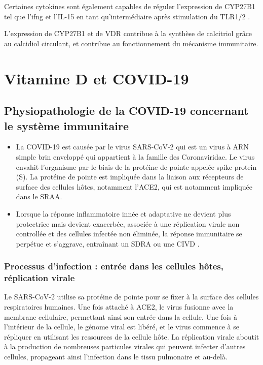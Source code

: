 \documentclass[
  a4paper,
  DIV=11,
  numbers=noendperiod,
  listof=totoc]{scrreprt}
\begin{document}
Certaines cytokines sont également capables de réguler l'expression de
\ac{CYP27B1} tel que l'\ac{ifng} \autocite{Stoffels.2009} et l'IL-15 en
tant qu'intermédiaire après stimulation du TLR1/2
\autocite{Krutzik.2008}.

L'expression de \ac{CYP27B1} et de \ac{VDR} contribue à la synthèse de
calcitriol grâce au calcidiol circulant, et contribue au fonctionnement
du mécanisme immunitaire.

\newpage{}

\chapter{Vitamine D et COVID-19}\label{vitamine-d-et-covid-19}

\section{Physiopathologie de la COVID-19 concernant le système
immunitaire}\label{physiopathologie-de-la-covid-19-concernant-le-systuxe8me-immunitaire}

\begin{itemize}
\item
  La \ac{COVID-19} est causée par le virus \ac{SARS-CoV-2} qui est un
  virus à ARN simple brin enveloppé qui appartient à la famille des
  Coronaviridae. Le virus envahit l'organisme par le biais de la
  protéine de pointe appelée spike protein (S). La protéine de pointe
  est impliquée dans la liaison aux récepteurs de surface des cellules
  hôtes, notamment l'\ac{ACE2}, qui est notamment impliquée dans le
  \ac{SRAA}.
\item
  Lorsque la réponse inflammatoire innée et adaptative ne devient plus
  protectrice mais devient exacerbée, associée à une réplication virale
  non controllée et des cellules infectée non éliminée, la réponse
  immunitaire se perpétue et s'aggrave, entraînant un \ac{SDRA} ou une
  \ac{CIVD} \autocite{Contreras-Bolívar.2023}.
\end{itemize}

\subsection{Processus d'infection : entrée dans les cellules hôtes,
réplication
virale}\label{processus-dinfection-entruxe9e-dans-les-cellules-huxf4tes-ruxe9plication-virale}

Le \ac{SARS-CoV-2} utilise sa protéine de pointe pour se fixer à la
surface des cellules respiratoires humaines. Une fois attaché à
\ac{ACE2}, le virus fusionne avec la membrane cellulaire, permettant
ainsi son entrée dans la cellule. Une fois à l'intérieur de la cellule,
le génome viral est libéré, et le virus commence à se répliquer en
utilisant les ressources de la cellule hôte. La réplication virale
aboutit à la production de nombreuses particules virales qui peuvent
infecter d'autres cellules, propageant ainsi l'infection dans le tissu
pulmonaire et au-delà.
\end{document}
